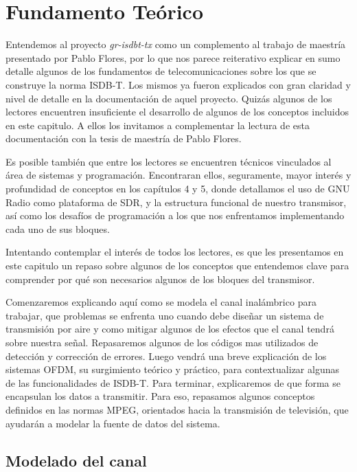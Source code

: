 \chapter{Fundamento Teórico}

Entendemos al proyecto \textit{gr-isdbt-tx} como un complemento al trabajo de maestría presentado por Pablo Flores, por lo que nos parece reiterativo explicar en sumo detalle algunos de los fundamentos de telecomunicaciones sobre los que se construye la norma ISDB-T. Los mismos ya fueron explicados con gran claridad y nivel de detalle en la documentación de aquel proyecto. Quizás algunos de los lectores encuentren insuficiente el desarrollo de algunos de los conceptos incluidos en este capitulo. A ellos los invitamos a complementar la lectura de esta documentación con la tesis de maestría de Pablo Flores.

Es posible también que entre los lectores se encuentren técnicos vinculados al área de sistemas y programación.  Encontraran ellos, seguramente, mayor interés y profundidad de conceptos en los capítulos 4 y 5, donde detallamos el uso de GNU Radio como plataforma de SDR, y la estructura funcional de nuestro transmisor, así como los desafíos de programación a los que nos enfrentamos implementando cada uno de sus bloques. 

Intentando contemplar el interés de todos los lectores, es que les presentamos en este capitulo un repaso sobre algunos de los conceptos que entendemos clave para comprender por qué son necesarios algunos de los bloques del transmisor. 

Comenzaremos explicando aquí como se modela el canal inalámbrico para trabajar, que problemas se enfrenta uno cuando debe diseñar un sistema de transmisión por aire y como mitigar algunos de los efectos que el canal tendrá sobre nuestra señal. Repasaremos algunos de los códigos mas utilizados de detección y corrección de errores. Luego vendrá una breve explicación de los sistemas OFDM, su surgimiento teórico y práctico, para contextualizar algunas de las funcionalidades de ISDB-T. Para terminar, explicaremos de que forma se encapsulan los datos a transmitir. Para eso, repasamos algunos conceptos definidos en las normas MPEG, orientados hacia la transmisión de televisión, que ayudarán a modelar la fuente de datos del sistema.  

\section{Modelado del canal}

